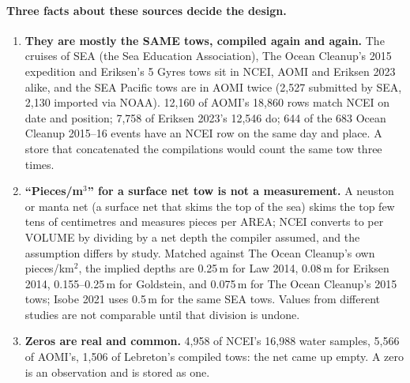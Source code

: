 \documentclass[10pt]{article}
\begin{document}
\paragraph{Three facts about these sources decide the design.}
\begin{enumerate}\itemsep2pt
\item \textbf{They are mostly the SAME tows, compiled again and again.} The cruises of SEA (the Sea Education
Association), The Ocean Cleanup's 2015 expedition and Eriksen's 5 Gyres tows sit in NCEI, AOMI and Eriksen 2023
alike, and the SEA Pacific tows are in AOMI twice (2,527 submitted by SEA, 2,130 imported via NOAA). 12,160 of
AOMI's 18,860 rows match NCEI on date and position; 7,758 of Eriksen 2023's 12,546 do; 644 of the 683 Ocean
Cleanup 2015--16 events have an NCEI row on the same day and place. A store that concatenated the compilations
would count the same tow three times.
\item \textbf{``Pieces/m$^3$'' for a surface net tow is not a measurement.} A neuston or manta net (a surface net
that skims the top of the sea) skims the top few tens of centimetres and measures pieces per AREA; NCEI converts to
per VOLUME by dividing by a net depth the compiler assumed, and the assumption differs by study. Matched against The
Ocean Cleanup's own pieces/km$^2$, the implied depths are 0.25\,m for Law 2014, 0.08\,m for Eriksen 2014,
0.155--0.25\,m for Goldstein, and 0.075\,m for The Ocean Cleanup's 2015 tows; Isobe 2021 uses 0.5\,m for the same
SEA tows. Values from different studies are not comparable until that division is undone.
\item \textbf{Zeros are real and common.} 4,958 of NCEI's 16,988 water samples, 5,566 of AOMI's, 1,506 of
Lebreton's compiled tows: the net came up empty. A zero is an observation and is stored as one.
\end{enumerate}
\end{document}
